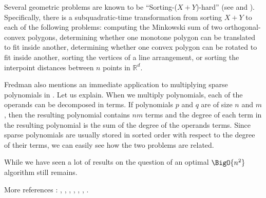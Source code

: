 Several geometric problems are known to be ``Sorting-($X + Y$)-hard'' (see \cite{barrera1996finding} and \cite{barequet2001polygon}). Specifically, there is a subquadratic-time transformation from sorting $X + Y$ to each of the following problems: computing the Minkowski sum of two orthogonal-convex polygons, determining whether one monotone polygon can be translated to fit inside another, determining whether one convex polygon can be rotated to fit inside another, sorting the vertices of a line arrangement, or sorting the interpoint distances between $n$ points in $\mathbb{R}^d$.

Fredman also mentions an immediate application to multiplying sparse polynomials in \cite{fredman1976good}. Let us explain. When we multiply polynomials, each of the operands can be decomposed in terms. If polynomials $p$ and $q$ are of size $n$ and $m$, then the resulting polynomial contains $nm$ terms and the degree of each term in the resulting polynomial is the sum of the degree of the operands terms. Since sparse polynomials are usually stored in sorted order with respect to the degree of their terms, we can easily see how the two problems are related.

While we have seen a lot of results on  the question of an optimal $\BigO{n^2}$ algorithm still remains.

More references : \cite{orourke:2012:sortxy}, \cite{kahnkim1}, \cite{dietzfelbinger1989lower}, \cite{steiger1995pseudo}, \cite{lambert1990sorting}, \cite{erickson1997lower}, \cite{bremner2012necklaces}.



